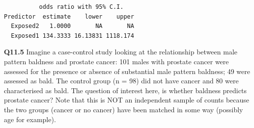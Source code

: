 \documentclass[
  oneside]{krantz}
\begin{document}
\begin{verbatim}
          odds ratio with 95% C.I.
Predictor  estimate    lower    upper
  Exposed2   1.0000       NA       NA
  Exposed1 134.3333 16.13831 1118.174
\end{verbatim}

\textbf{Q11.5} Imagine a case-control study looking at the relationship between male pattern baldness and prostate cancer: 101 males with prostate cancer were assessed for the presence or absence of substantial male pattern baldness; 49 were assessed as bald. The control group (n = 98) did not have cancer and 80 were characterised as bald. The question of interest here, is whether baldness predicts prostate cancer? Note that this is NOT an independent sample of counts because the two groups (cancer or no cancer) have been matched in some way (possibly age for example).
\end{document}
